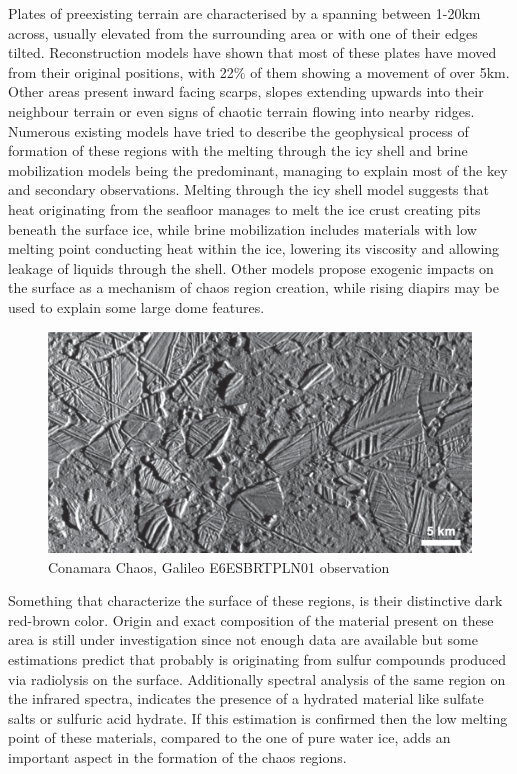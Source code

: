 Plates of preexisting terrain are characterised by a spanning between 1-20km across, usually elevated from the surrounding area or with one of their edges tilted. Reconstruction models have shown that most of these plates have moved from their original positions, with 22\% of them showing a movement of over 5km. Other areas present inward facing scarps, slopes extending upwards into their neighbour terrain or even signs of chaotic terrain flowing into nearby ridges.
Numerous existing models have tried to describe the geophysical process of formation of these regions with the melting through the icy shell and brine mobilization models being the predominant, managing to explain most of the key and secondary observations. Melting through the icy shell model suggests that heat originating from the seafloor manages to melt the ice crust creating pits beneath the surface ice, while brine mobilization includes materials with low melting point conducting heat within the ice, lowering its viscosity and allowing leakage of liquids through the shell. Other models propose exogenic impacts on the surface as a mechanism of chaos region creation, while rising diapirs may be used to explain some large dome features.  
\begin{figure}[htb]
    \centering
    \includegraphics[scale=0.3]{figures/Orbiter/chaos.png}
    \caption{Conamara Chaos, Galileo E6ESBRTPLN01 observation \cite{chaosterrain}}
    \label{fig:conamara_chaos}
\end{figure}
Something that characterize the surface of these regions, is their distinctive dark red-brown color. Origin and exact composition of the material present on these area is still under investigation since not enough data are available but some estimations predict that probably is originating from sulfur compounds produced via radiolysis on the surface. Additionally spectral analysis of the same region on the infrared spectra, indicates the presence of a hydrated material like sulfate salts or sulfuric acid hydrate. If this estimation is confirmed then the low melting point of these materials, compared to the one of pure water ice, adds an important aspect in the formation of the chaos regions.

